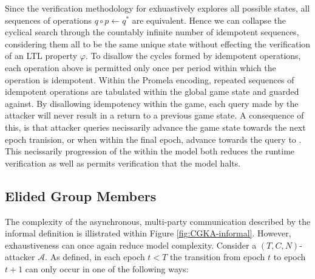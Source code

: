 Since the verification methodology for  exhuastively explores all possible \CGKAsec states, all sequences of operations \(q \circ p \gets q^{*}\) are equivalent.
Hence we can collapse the cyclical search through the countably infinite number of idempotent sequences, considering them all to be the same unique state without effecting the verification of an LTL property \(\varphi\).
To disallow the cycles formed by idempotent operations, each operation above is permitted only once per period within which the operation is idempotent.
Within the \CGKAmod Promela encoding, repeated sequences of idempotent operations are tabulated within the global game state and guarded against.
By disallowing idempotency within the game, each query made by the attacker will never result in a return to a previous game state.
A consequence of this, is that attacker queries necissarily advance the game state towards the next epoch tranision, or when within the final epoch, advance towards the query to .
This necissarily progression of the \CGKAsec within the model  both reduces the runtime verification as well as permits verification that the model  halts.


\hypertarget{elided-group-members}{%
\subsection{Elided Group Members}\label{elided-group-members}}

The complexity of the asynchronous, multi-party communication described by the informal \CGKAsec definition is illistrated within Figure \ref{fig:CGKA-informal}.
However, exhaustiveness can once again reduce model complexity.
Consider a \((T, C, N)\)-attacker \(\mathcal{A}\).
As defined, in each epoch $t < T$ the transition from epoch $t$ to epoch $t+1$ can only occur in one of the following ways:

